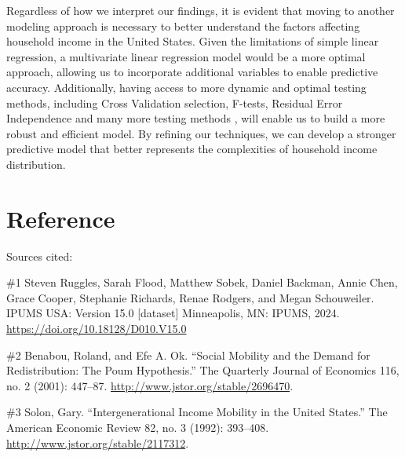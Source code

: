 \documentclass[
]{article}
\begin{document}
Regardless of how we interpret our findings, it is evident that moving
to another modeling approach is necessary to better understand the
factors affecting household income in the United States. Given the
limitations of simple linear regression, a multivariate linear
regression model would be a more optimal approach, allowing us to
incorporate additional variables to enable predictive accuracy.
Additionally, having access to more dynamic and optimal testing methods,
including Cross Validation selection, F-tests, Residual Error
Independence and many more testing methods , will enable us to build a
more robust and efficient model. By refining our techniques, we can
develop a stronger predictive model that better represents the
complexities of household income distribution.

\section{Reference}\label{reference}

Sources cited:

\#1 Steven Ruggles, Sarah Flood, Matthew Sobek, Daniel Backman, Annie
Chen, Grace Cooper, Stephanie Richards, Renae Rodgers, and Megan
Schouweiler. IPUMS USA: Version 15.0 {[}dataset{]} Minneapolis, MN:
IPUMS, 2024. \url{https://doi.org/10.18128/D010.V15.0}

\#2 Benabou, Roland, and Efe A. Ok. ``Social Mobility and the Demand for
Redistribution: The Poum Hypothesis.'' The Quarterly Journal of
Economics 116, no. 2 (2001): 447--87.
\url{http://www.jstor.org/stable/2696470}.

\#3 Solon, Gary. ``Intergenerational Income Mobility in the United
States.'' The American Economic Review 82, no. 3 (1992): 393--408.
\url{http://www.jstor.org/stable/2117312}.
\end{document}
